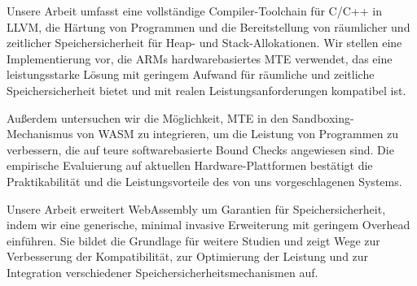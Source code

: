 Unsere Arbeit umfasst eine vollständige Compiler-Toolchain für C/C++ in LLVM, die Härtung von Programmen und die Bereitstellung von räumlicher und zeitlicher Speichersicherheit für Heap- und Stack-Allokationen.
Wir stellen eine Implementierung vor, die ARMs hardwarebasiertes \acf*{MTE} verwendet, das eine leistungsstarke Lösung mit geringem Aufwand für räumliche und zeitliche Speichersicherheit bietet und mit realen Leistungsanforderungen kompatibel ist.

Außerdem untersuchen wir die Möglichkeit, \acs*{MTE} in den Sandboxing-Mechanismus von \acs*{WASM} zu integrieren, um die Leistung von Programmen zu verbessern, die auf teure softwarebasierte Bound Checks angewiesen sind.
Die empirische Evaluierung auf aktuellen Hardware-Plattformen bestätigt die Praktikabilität und die Leistungsvorteile des von uns vorgeschlagenen Systems.

Unsere Arbeit erweitert WebAssembly um Garantien für Speichersicherheit, indem wir eine generische, minimal invasive Erweiterung mit geringem Overhead einführen.
Sie bildet die Grundlage für weitere Studien und zeigt Wege zur Verbesserung der Kompatibilität, zur Optimierung der Leistung und zur Integration verschiedener Speichersicherheitsmechanismen auf.
